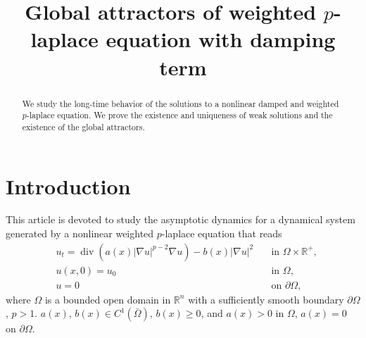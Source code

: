 \documentclass[11pt]{amsart}
\title[Attractor of $p$-laplace equation]{Global attractors of weighted $p$-laplace equation with damping term}
\theoremstyle{definition}
\numberwithin{equation}{section}
\newcommand*\abs[1]{\lvert#1\rvert}
\newcommand\R{\mathbb{R}}
\DeclareMathOperator{\Div}{div}
\begin{document}
\begin{abstract}
	We study the long-time behavior of the solutions to a nonlinear damped and weighted $p$-laplace equation. We prove the
	existence and uniqueness of weak solutions and the existence
	of the global attractors.
\end{abstract}

\maketitle

\section{Introduction}
This article is devoted to study the asymptotic dynamics for a dynamical system generated by a nonlinear
weighted $p$-laplace equation that reads
\begin{equation}\label{eq:main}
\begin{alignedat}{2}
& u_t = \Div(a(x)\abs{\nabla u}^{p-2}\nabla u) - b(x)\abs{\nabla u}^2 \quad &\text{in } \Omega \times \R^+,\\
& u(x,0) = u_0 \quad &\text{in } \Omega,\\
& u = 0 \quad &\text{on } \partial\Omega,
\end{alignedat}
\end{equation}
where $\Omega$ is a bounded open domain in $\R^{n}$ with a sufficiently smooth boundary $\partial\Omega$, $p>1$.
$ a(x)$, $b(x) \in C^1(\bar{\Omega}) $, $b(x) \geq 0$, and $a(x) > 0$ in $\Omega$, $a(x) = 0$ on $\partial\Omega$.
\end{document}
